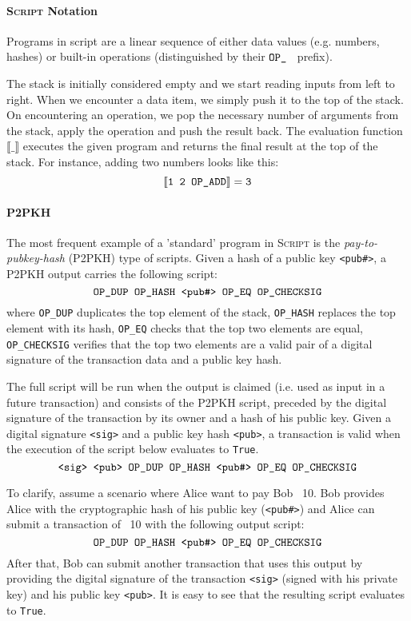\documentclass[acmsmall,nonacm=true,screen=true]{acmart}
\begin{document}
\newcommand\ttt{\texttt}
\newcommand\stack[1]{\text{\ttt{#1}}}
\newcommand\Semantics[1]{\llbracket \stack{#1} \rrbracket}

\paragraph{\textsc{Script} Notation}
Programs in script are a linear sequence of either data values (e.g. numbers, hashes) or
built-in operations (distinguished by their $\stack{OP\_\ }$ prefix).

The stack is initially considered empty and we start reading inputs from left to right.
When we encounter a data item, we simply push it to the top of the stack.
On encountering an operation, we pop the necessary number of arguments from the stack, apply
the operation and push the result back.
The evaluation function $\llbracket \_ \rrbracket$ executes the given program and returns the final
result at the top of the stack. For instance, adding two numbers looks like this:
\[
  \Semantics{1 2 OP\_ADD} = \stack{3}
\]
\paragraph{P2PKH}
The most frequent example of a 'standard' program in \textsc{Script} is the
\textit{pay-to-pubkey-hash} (P2PKH) type of scripts. Given a hash of a public key \texttt{<pub\#>},
a P2PKH output carries the following script:
\[
  \stack{OP\_DUP OP\_HASH <pub\#> OP\_EQ OP\_CHECKSIG}
\]
where \ttt{OP\_DUP} duplicates the top element of the stack, \ttt{OP\_HASH} replaces the top element with its hash,
\ttt{OP\_EQ} checks that the top two elements are equal, \ttt{OP\_CHECKSIG} verifies that the top two elements
are a valid pair of a digital signature of the transaction data and a public key hash.

The full script will be run when the output is claimed (i.e. used as input in a future transaction)
and consists of the P2PKH script, preceded by the digital signature of the transaction by its owner and a hash of
his public key. Given a digital signature \ttt{<sig>} and a public key hash \ttt{<pub>}, a transaction is valid
when the execution of the script below evaluates to \ttt{True}.
\[
  \stack{<sig> <pub> OP\_DUP OP\_HASH <pub\#> OP\_EQ OP\_CHECKSIG}
\]

To clarify, assume a scenario where Alice want to pay Bob \bitcoin ~10.
Bob provides Alice with the cryptographic hash of his public key (\ttt{<pub\#>})
and Alice can submit a transaction of \bitcoin ~10 with the following output script:
\[
  \stack{OP\_DUP OP\_HASH <pub\#> OP\_EQ OP\_CHECKSIG}
\]
After that, Bob can submit another transaction that uses this output by providing the digital signature
of the transaction \ttt{<sig>} (signed with his private key) and his public key \ttt{<pub>}.
It is easy to see that the resulting script evaluates to \ttt{True}.
\end{document}
